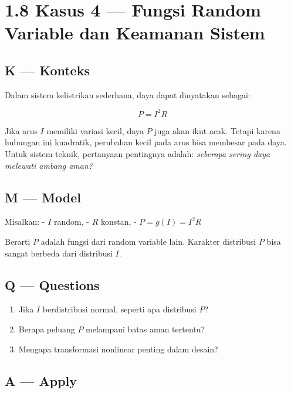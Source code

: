 \documentclass[
  letterpaper,
  DIV=11,
  numbers=noendperiod]{scrreprt}
\providecommand{\tightlist}{%
  \setlength{\itemsep}{0pt}\setlength{\parskip}{0pt}}
\begin{document}
\section{1.8 Kasus 4 --- Fungsi Random Variable dan Keamanan
Sistem}\label{kasus-4-fungsi-random-variable-dan-keamanan-sistem}

\subsection{K --- Konteks}\label{k-konteks-4}

Dalam sistem kelistrikan sederhana, daya dapat dinyatakan sebagai:

\[
P = I^2 R
\]

Jika arus \(I\) memiliki variasi kecil, daya \(P\) juga akan ikut acak.
Tetapi karena hubungan ini kuadratik, perubahan kecil pada arus bisa
membesar pada daya. Untuk sistem teknik, pertanyaan pentingnya adalah:
\emph{seberapa sering daya melewati ambang aman?}

\subsection{M --- Model}\label{m-model-4}

Misalkan: - \(I\) random, - \(R\) konstan, - \(P = g(I) = I^2 R\)

Berarti \(P\) adalah fungsi dari random variable lain. Karakter
distribusi \(P\) bisa sangat berbeda dari distribusi \(I\).

\subsection{Q --- Questions}\label{q-questions-4}

\begin{enumerate}
\def\labelenumi{\arabic{enumi}.}
\tightlist
\item
  Jika \(I\) berdistribusi normal, seperti apa distribusi \(P\)?
\item
  Berapa peluang \(P\) melampaui batas aman tertentu?
\item
  Mengapa transformasi nonlinear penting dalam desain?
\end{enumerate}

\subsection{A --- Apply}\label{a-apply-4}
\end{document}
